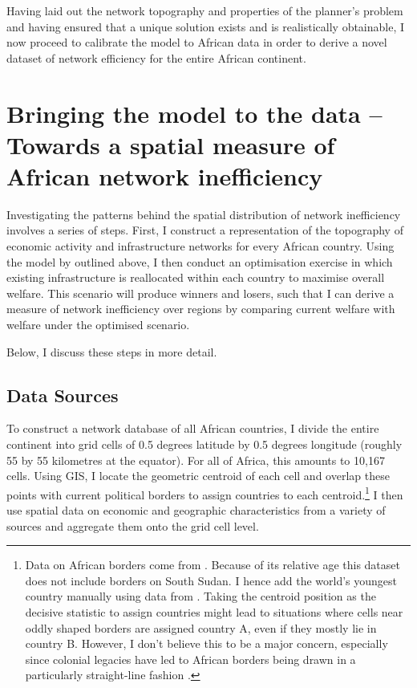 \documentclass[11pt, oneside]{article}   	%
\begin{document}
Having laid out the network topography and properties of the planner's problem and having ensured that a unique solution exists and is realistically obtainable, I now proceed to calibrate the model to African data in order to derive a novel dataset of network efficiency for the entire African continent.

\section{Bringing the model to the data -- Towards a spatial measure of African network inefficiency}
\label{chapter:calibration}
Investigating the patterns behind the spatial distribution of network inefficiency involves a series of steps. First, I construct a representation of the topography of economic activity and infrastructure networks for every African country. Using the model by \cite{fajgelbaum_optimal_2017} outlined above, I then conduct an optimisation exercise in which existing infrastructure is reallocated within each country to maximise overall welfare. This scenario will produce winners and losers, such that I can derive a measure of network inefficiency over regions by comparing current welfare with welfare under the optimised scenario.

Below, I discuss these steps in more detail.

\subsection{Data Sources}

To construct a network database of all African countries, I divide the entire continent into grid cells of 0.5 degrees latitude by 0.5 degrees longitude (roughly 55 by 55 kilometres at the equator). For all of Africa, this amounts to 10,167 cells. Using GIS, I locate the geometric centroid of each cell and overlap these points with current political borders to assign countries to each centroid.\footnote{Data on African borders come from \cite{Sandvik_WorldBordersDataset_2008}. Because of its relative age this dataset does not include borders on South Sudan. I hence add the world's youngest country manually using data from \cite{OCHA_SouthSudanAdministrative_2017}. Taking the centroid position as the decisive statistic to assign countries might lead to situations where cells near oddly shaped borders are assigned country A, even if they mostly lie in country B. However, I don't believe this to be a major concern, especially since colonial legacies have led to African borders being drawn in a particularly straight-line fashion \citep[see][]{Alesina_ArtificialStates_2011}.} I then use spatial data on economic and geographic characteristics from a variety of sources and aggregate them onto the grid cell level.
\end{document}
